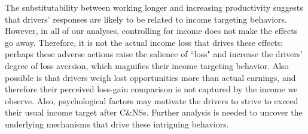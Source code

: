 \documentclass[reviewmode]{restud}
\begin{document}
The substitutability between working longer and increasing productivity suggests that drivers' responses are likely to be related to income targeting behaviors. However, in all of our analyses, controlling for income does not make the effects go away. Therefore, it is not the actual income loss that drives these effects; perhaps these adverse actions raise the salience of ``loss" and increase the drivers' degree of loss aversion, which magnifies their income targeting behavior. Also possible is that drivers weigh lost opportunities more than actual earnings, and therefore their perceived loss-gain comparison is not captured by the income we observe. Also, psychological factors may motivate the drivers to strive to exceed their usual income target after C\&NSs. Further analysis is needed to uncover the underlying mechanisms that drive these intriguing behaviors.


\end{document}
